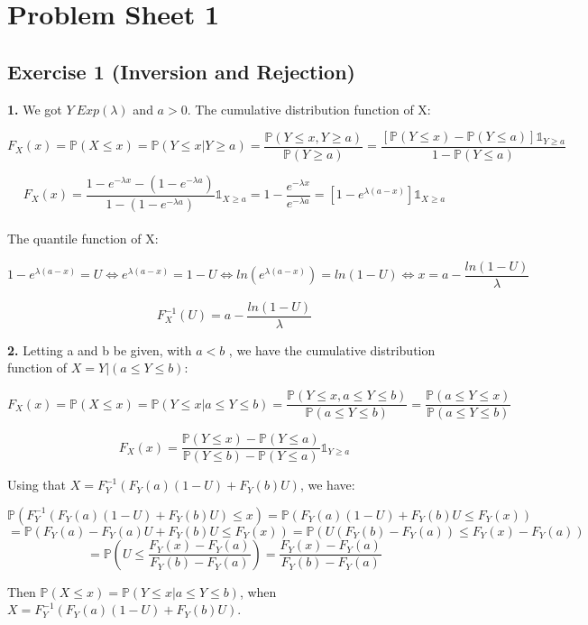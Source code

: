 \documentclass[a4paper]{article}
\begin{document}
\section*{Problem Sheet 1}

\vspace{0,75cm}

\subsection*{Exercise 1 (Inversion and Rejection)}
\vspace{0,75cm}
\textbf{1.} We got $Y ~ Exp(\lambda)$ and $a>0$. The cumulative distribution function of X:


$$F_{X}(x) = \mathbb{P}(X \leq x) = \mathbb{P}(Y \leq x | Y \geq a) = \frac{\mathbb{P}(Y \leq x,Y \geq a)}{\mathbb{P}(Y \geq a)} = \frac{[\mathbb{P}(Y \leq x) - \mathbb{P}(Y \leq a)]\mathbb{1}_{Y \geq a}}{1 - \mathbb{P}(Y \leq a)}$$

$$F_{X}(x) =  \frac{1 - e^{- \lambda x}- (1-e^{- \lambda a})}{1-(1-e^{- \lambda a})}\mathbb{1}_{X \geq a} = 1-\frac{e^{- \lambda x}}{e^{- \lambda a}} = [1- e^{\lambda(a-x)}]\mathbb{1}_{X \geq a}$$\\

\hspace{0,5cm}The quantile function of X:

$$ 1-e^{\lambda(a-x)} = U \Leftrightarrow e^{\lambda(a-x)} = 1-U \Leftrightarrow ln(e^{\lambda(a-x)}) = ln(1-U) \Leftrightarrow x = a-\frac{ln(1-U)}{\lambda} $$

$$F^{-1}_{X}(U) =  a-\frac{ln(1-U)}{\lambda}$$

\vspace{0,75cm}
\textbf{2.} Letting a and b be given, with $a<b$ , we have the cumulative distribution function of $X = Y|(a \leq Y \leq b)$:

$$F_{X}(x) = \mathbb{P}(X \leq x) = \mathbb{P}(Y \leq x |a \leq Y \leq b) = \frac{\mathbb{P}(Y \leq x,a \leq Y \leq b)}{\mathbb{P}(a \leq Y \leq b)}= \frac{\mathbb{P}(a \leq Y \leq x)}{\mathbb{P}(a \leq Y \leq b)} $$

$$F_{X}(x) = \frac{\mathbb{P}( Y \leq x) - \mathbb{P}(Y \leq a)}{\mathbb{P}(Y \leq b) - \mathbb{P}(Y \leq a)}\mathbb{1}_{Y \geq a}$$

\vspace{0,5cm}
\hspace{0,5cm}Using that $X = F^{-1}_{Y}(F_{Y}(a)(1-U)+F_{Y}(b)U)$, we have:

$$\mathbb{P}(F^{-1}_{Y}(F_{Y}(a)(1-U)+F_{Y}(b)U) \leq x) = \mathbb{P}(F_{Y}(a)(1-U)+F_{Y}(b)U \leq F_{Y}(x))$$
$$=\mathbb{P}(F_{Y}(a)-F_{Y}(a)U+F_{Y}(b)U \leq F_{Y}(x)) = \mathbb{P}(U(F_{Y}(b)-F_{Y}(a)) \leq F_{Y}(x)-F_{Y}(a))$$
$$=\mathbb{P}(U \leq \frac{F_{Y}(x)-F_{Y}(a)}{F_{Y}(b)-F_{Y}(a)}) = \frac{F_{Y}(x)-F_{Y}(a)}{F_{Y}(b)-F_{Y}(a)} $$

\vspace{0,5cm}

Then $\mathbb{P}(X \leq x) = \mathbb{P}(Y \leq x|a \leq Y \leq b)$, when $X = F^{-1}_{Y}(F_{Y}(a)(1-U)+F_{Y}(b)U)$.
\end{document}
